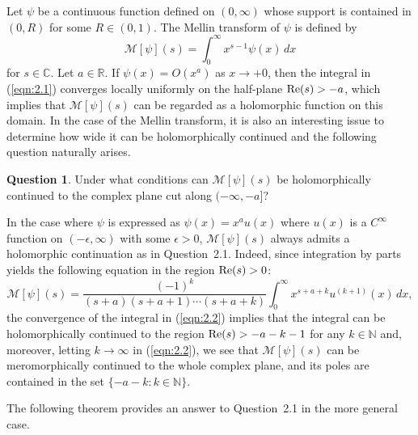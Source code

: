 \documentclass[12pt]{amsart}
\numberwithin{equation}{section}
\theoremstyle{definition}
\newtheorem{question}[theorem]{Question}
\theoremstyle{remark}
\newcommand{\R}{{\mathbb R}}
\newcommand{\C}{{\mathbb C}}
\newcommand{\N}{{\mathbb N}}
\newcommand{\1}{{\bf 1}}
\begin{document}
Let $\psi$ be a continuous function 
defined on $(0,\infty)$ whose support is contained 
in $(0,R)$ for some $R \in (0,1)$.
The Mellin transform of $\psi$ is defined by
\begin{equation}\label{eqn:2.1}
{\mathcal M}[\psi](s)
=\int_0^{\infty} x^{s-1}\psi(x)\,dx
\end{equation}
for $s \in \C$. 
Let $a\in\R$. 
If $\psi(x)=O(x^{a})$ as 
$x\to +0$, then 
the integral in (\ref{eqn:2.1}) converges locally uniformly
on the half-plane ${\rm Re}(s)>-a$, 
which implies that 
${\mathcal M}[\psi](s)$ can be 
regarded as a holomorphic function 
on this domain. 
In the case of the Mellin transform, 
it is also an interesting issue to determine
how wide it can be holomorphically continued
and the following question naturally arises. 
\begin{question}
Under what conditions can  
${\mathcal M}[\psi](s)$
be holomorphically continued to the complex plane cut along 
$(-\infty,-a]$?
\end{question}
In the case where $\psi$ is expressed as 
$\psi(x)=x^a u(x)$ where $u(x)$ is a 
$C^{\infty}$ function on 
$(-\epsilon, \infty)$ with some $\epsilon>0$, 
${\mathcal M}[\psi](s)$ always admits a
holomorphic continuation as in Question~2.1.
Indeed, 
since integration by parts yields the following 
equation in the region ${\rm Re}(s)>0$:
\begin{equation}\label{eqn:2.2}
{\mathcal M}[\psi](s)
=\frac{(-1)^k}{(s+a)(s+a+1)\cdots(s+a+k)}
\int_0^{\infty} x^{s+a+k} u^{(k+1)}(x)\,dx, 
\end{equation}
the convergence of the integral 
in (\ref{eqn:2.2}) implies 
that 
the integral can be holomorphically 
continued to the region ${\rm Re}(s)>-a-k-1$
for any $k\in\N$ and, 
moreover, letting $k\to \infty$ in (\ref{eqn:2.2}), 
we see that 
${\mathcal M}[\psi](s)$ can be meromorphically 
continued to the whole complex plane, and 
its poles are contained in the set 
$\{-a-k:k\in\N\}$.  

The following theorem provides an answer 
to Question~2.1 in the more general case. 
\end{document}
